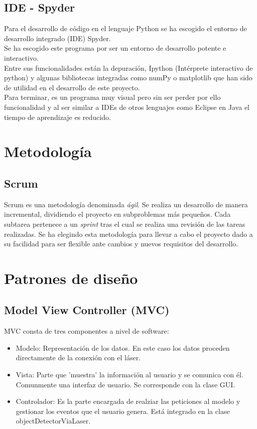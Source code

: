 \subsection{IDE - Spyder}
Para el desarrollo de código en el lenguaje Python se ha escogido el entorno de desarrollo integrado (IDE) Spyder. \\
Se ha escogido este programa por ser un entorno de desarrollo potente e interactivo.\\ Entre sus funcionalidades están la depuración, Ipython (Intérprete interactivo de python) y algunas bibliotecas integradas como numPy o matplotlib que han sido de utilidad en el desarrollo de este proyecto. \\
Para terminar, es un programa muy visual pero sin ser perder por ello funcionalidad y al ser similar a IDEs de otros lenguajes como Eclipse en Java el tiempo de aprendizaje es reducido.\\

\section{Metodología}
\subsection{Scrum}
Scrum es una metodología denominada \emph{ágil}.
Se realiza un desarrollo de manera incremental, dividiendo el proyecto en subproblemas más pequeños.
Cada subtarea pertenece a un \emph{sprint} tras el cual se realiza una revisión de las tareas realizadas.
Se ha elegindo esta metodología para llevar a cabo el proyecto dado a su facilidad para ser flexible ante cambios y nuevos requisitos del desarrollo.

\section{Patrones de diseño}
\subsection{Model View Controller (MVC)}
MVC consta de tres componentes a nivel de software:
\begin{itemize}
\item Modelo: Representación de los datos. En este caso los datos proceden directamente de la conexión con el láser.
\item Vista: Parte que 'muestra' la información al usuario y se comunica con él. Comunmente una interfaz de usuario. Se corresponde con la clase GUI.
\item Controlador: Es la parte encargada de realziar las peticiones al modelo y gestionar los eventos que el usuario genera. Está integrado en la clase objectDetectorViaLaser.
\end{itemize}

